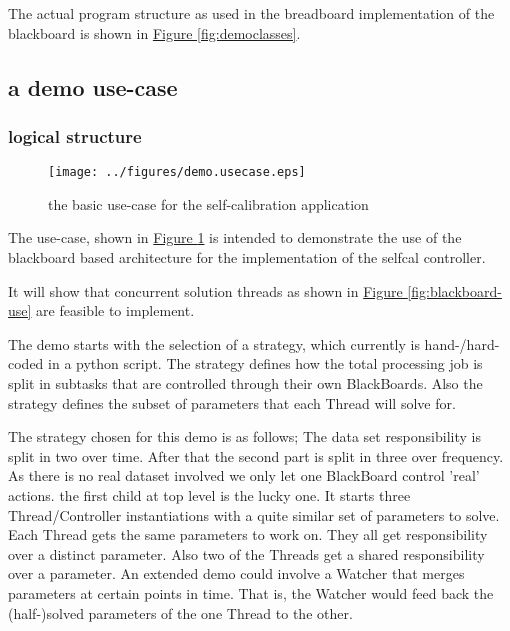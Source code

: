 \documentclass[]{lofar}
\begin{document}
      The actual program structure as used in the breadboard
      implementation of the blackboard is shown in
      \hyperlink{fig:democlasses}{Figure \ref{fig:democlasses}}.

    \subsection{a demo use-case}
    \label{sec:demo-usecase}
      \subsubsection{logical structure}
      \label{subsec:logical-structure}
      \begin{figure}
        \texttt{[image: ../figures/demo.usecase.eps]}
        \hypertarget{fig:demo-usecase}{}
        \caption{the basic use-case for the self-calibration
        application\label{fig:demo-usecase}}
      \end{figure}

      The use-case, shown in \hyperlink{fig:demo-usecase}{Figure
      \ref{fig:demo-usecase}} is intended to demonstrate the use of
      the blackboard based architecture for the implementation of the
      selfcal controller.

      It will show that concurrent solution threads as shown in
      \hyperlink{fig:blackboard-use}{Figure
      \ref{fig:blackboard-use}} are feasible to implement.

      The demo starts with the selection of a strategy, which
      currently is hand-/hard-coded in a python script. The strategy
      defines how the total processing job is split in subtasks that
      are controlled through their own BlackBoards. Also the strategy
      defines the subset of parameters that each Thread will solve
      for.

      The strategy chosen for this demo is as follows; The data set
      responsibility is split in two over time. After that the second
      part is split in three over frequency. As there is no real
      dataset involved we only let one BlackBoard control 'real'
      actions. the first child at top level is the lucky one. It
      starts three Thread/Controller instantiations with a quite
      similar set of parameters to solve. Each Thread gets the same
      parameters to work on. They all get responsibility over a
      distinct parameter. Also two of the Threads get a shared
      responsibility over a parameter. An extended demo could involve
      a Watcher that merges parameters at certain points in time. That
      is, the Watcher would feed back the (half-)solved parameters of
      the one Thread to the other.
\end{document}
